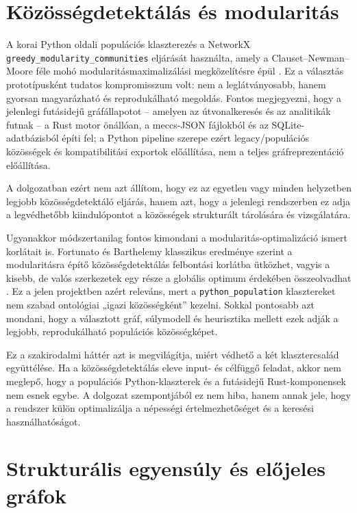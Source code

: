 ﻿\documentclass[a4paper,12pt]{report}
\begin{document}
\section{Közösségdetektálás és modularitás}

A korai Python oldali populációs klaszterezés a NetworkX \texttt{greedy\_modularity\_communities} eljárását használta, amely a Clauset--Newman--Moore féle mohó modularitásmaximalizálási megközelítésre épül \cite{clauset2004,networkx_greedy}. Ez a választás prototípusként tudatos kompromisszum volt: nem a leglátványosabb, hanem gyorsan magyarázható és reprodukálható megoldás. Fontos megjegyezni, hogy a jelenlegi futásidejű gráfállapotot -- amelyen az útvonalkeresés és az analitikák futnak -- a Rust motor önállóan, a meccs-JSON fájlokból és az SQLite-adatbázisból építi fel; a Python pipeline szerepe ezért legacy/populációs közösségek és kompatibilitási exportok előállítása, nem a teljes gráfreprezentáció előállítása.

A dolgozatban ezért nem azt állítom, hogy ez az egyetlen vagy minden helyzetben legjobb közösségdetektáló eljárás, hanem azt, hogy a jelenlegi rendszerben ez adja a legvédhetőbb kiindulópontot a közösségek strukturált tárolására és vizsgálatára.

Ugyanakkor módszertanilag fontos kimondani a modularitás-optimalizáció ismert korlátait is. Fortunato és Barthelemy klasszikus eredménye szerint a modularitásra építő közösségdetektálás felbontási korlátba ütközhet, vagyis a kisebb, de valós szerkezetek egy része a globális optimum érdekében összeolvadhat \cite{fortunato_barthelemy2007}. Ez a jelen projektben azért releváns, mert a \texttt{python\_population} klasztereket nem szabad ontológiai „igazi közösségként” kezelni. Sokkal pontosabb azt mondani, hogy a választott gráf, súlymodell és heurisztika mellett ezek adják a legjobb, reprodukálható populációs közösségképet.

Ez a szakirodalmi háttér azt is megvilágítja, miért védhető a két klasztercsalád együttélése. Ha a közösségdetektálás eleve input- és célfüggő feladat, akkor nem meglepő, hogy a populációs Python-klaszterek és a futásidejű Rust-komponensek nem esnek egybe. A dolgozat szempontjából ez nem hiba, hanem annak jele, hogy a rendszer külön optimalizálja a népességi értelmezhetőséget és a keresési használhatóságot.

\section{Strukturális egyensúly és előjeles gráfok}
\end{document}
